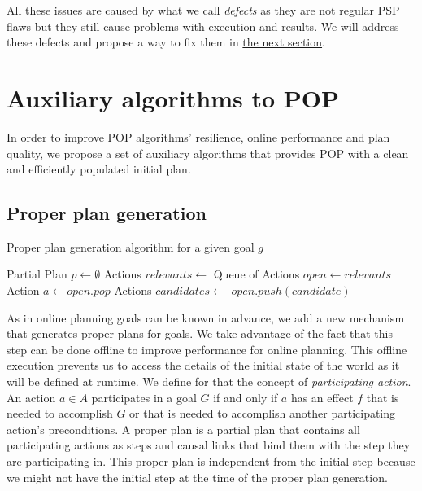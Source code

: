 \documentclass[]{article}
\begin{document}
All these issues are caused by what we call \emph{defects} as they are
not regular PSP flaws but they still cause problems with execution and
results. We will address these defects and propose a way to fix them in
\hyperref[defects]{the next section}.

\section{Auxiliary algorithms to POP}\label{auxiliary-algorithms-to-pop}

In order to improve POP algorithms' resilience, online performance and
plan quality, we propose a set of auxiliary algorithms that provides POP
with a clean and efficiently populated initial plan.

\subsection{Proper plan generation}\label{proper-plan-generation}

\begin{algorithm}\caption{Proper plan generation algorithm for a given goal $g$}\label{properplan}\begin{algorithmic}

 \State Partial Plan
\(p \gets \emptyset\) \State Actions \(relevants \gets\)
\State Queue of Actions \(open \gets relevants\)
 \State Action \(a\gets open.pop\)
\State Actions \(candidates \gets\) 
 
\State \(open.push(candidate)\) \EndIf
        \EndFor
    \EndWhile
\EndFunction

\end{algorithmic}\end{algorithm}

As in online planning goals can be known in advance, we add a new
mechanism that generates proper plans for goals. We take advantage of
the fact that this step can be done offline to improve performance for
online planning. This offline execution prevents us to access the
details of the initial state of the world as it will be defined at
runtime. We define for that the concept of \emph{participating action}.
An action \(a \in A\) participates in a goal \(G\) if and only if \(a\)
has an effect \(f\) that is needed to accomplish \(G\) or that is needed
to accomplish another participating action's preconditions. A proper
plan is a partial plan that contains all participating actions as steps
and causal links that bind them with the step they are participating in.
This proper plan is independent from the initial step because we might
not have the initial step at the time of the proper plan generation.
\end{document}

